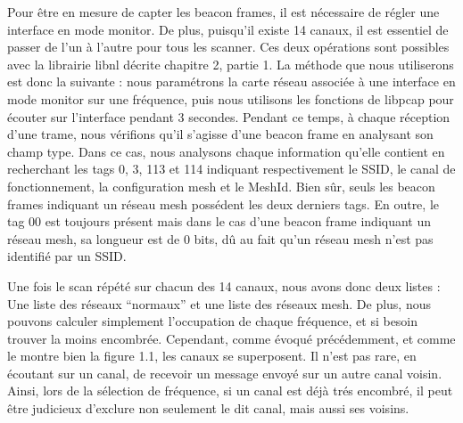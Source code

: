 Pour être en mesure de capter les beacon frames, il est nécessaire de régler une interface en mode monitor. De plus, puisqu'il existe
14 canaux, il est essentiel de passer de l'un à l'autre pour tous les scanner. Ces deux opérations sont possibles avec la librairie 
libnl décrite chapitre 2, partie 1. La méthode que nous utiliserons est donc la suivante : nous paramétrons la carte réseau associée à
une interface en mode monitor sur une fréquence, puis nous utilisons les fonctions de libpcap pour écouter sur l'interface pendant 3
secondes. Pendant ce temps, à chaque réception d'une trame, nous vérifions qu'il s'agisse d'une beacon frame en analysant son champ
type. Dans ce cas, nous analysons chaque information qu'elle contient en recherchant les tags 0, 3, 113 et 114 indiquant
respectivement le SSID, le canal de fonctionnement, la configuration mesh et le MeshId. Bien sûr, seuls les beacon frames indiquant
un réseau mesh possédent les deux derniers tags. En outre, le tag 00 est toujours présent mais dans le cas d'une beacon frame 
indiquant un réseau mesh, sa longueur est de 0 bits, dû au fait qu'un réseau mesh n'est pas identifié par un SSID.

Une fois le scan répété sur chacun des 14 canaux, nous avons donc deux listes : Une liste des réseaux ``normaux'' et une liste des
réseaux mesh. De plus, nous pouvons calculer simplement l'occupation de chaque fréquence, et si besoin trouver la moins encombrée.
Cependant, comme évoqué précédemment, et comme le montre bien la figure 1.1, les canaux se superposent. Il n'est pas rare, en
écoutant sur un canal, de recevoir un message envoyé sur un autre canal voisin. Ainsi, lors de la sélection de fréquence, si un canal
est déjà trés encombré, il peut être judicieux d'exclure non seulement le dit canal, mais aussi ses voisins.